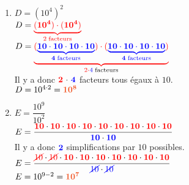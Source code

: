 \documentclass[a4paper,12pt]{report}
\begin{document}
\begin{Correction}
\begin{EXO}{}{}
\begin{enumerate}[itemsep=2em]
\item $D=(10^{4})^{2}$\\$D=\color{red}{\underbrace{\mathbf{\color{red}{(10^4)}} \cdot \mathbf{\color{red}{(10^4)}}}_{2\thickspace\text{facteurs}}}$\\$D=\color{red}{\underbrace{\mathbf{\color{red}{(\color{blue}{\underbrace{\mathbf{\color{blue}{10}} \cdot \mathbf{\color{blue}{10}}\cdot \mathbf{\color{blue}{10}}\cdot \mathbf{\color{blue}{10}}}_{4\thickspace\text{facteurs}}}\color{red})}} \cdot \mathbf{\color{red}{(\color{blue}{\underbrace{\mathbf{\color{blue}{10}} \cdot \mathbf{\color{blue}{10}}\cdot \mathbf{\color{blue}{10}}\cdot \mathbf{\color{blue}{10}}}_{4\thickspace\text{facteurs}}}\color{red})}}}_{2\cdot\color{blue}{4}\thickspace\color{black}{\text{facteurs}}}}$\\Il y a donc $\mathbf{\color{red}{2}~\color{black}{\cdot}~\color{blue}{4}}$ facteurs tous égaux à $10$.\\$D=10^{4\cdot2} = {\color[HTML]{f15929}\boldsymbol{10^{8}}}$
\item $E=\dfrac{10^{9}}{10^{2}}$\\$E=\dfrac{\mathbf{\color{red}{10}} \cdot \mathbf{\color{red}{10}}\cdot \mathbf{\color{red}{10}}\cdot \mathbf{\color{red}{10}}\cdot \mathbf{\color{red}{10}}\cdot \mathbf{\color{red}{10}}\cdot \mathbf{\color{red}{10}}\cdot \mathbf{\color{red}{10}}\cdot \mathbf{\color{red}{10}}}{\mathbf{\color{blue}{10}} \cdot \mathbf{\color{blue}{10}}}$\\Il y a donc $\mathbf{\color{blue}{2}}$ simplifications par $10$ possibles.\\$E=\dfrac{\mathbf{\color{red}{\cancel{10}}} \cdot \mathbf{\color{red}{\cancel{10}}}\cdot\mathbf{\color{red}{10}} \cdot \mathbf{\color{red}{10}}\cdot \mathbf{\color{red}{10}}\cdot \mathbf{\color{red}{10}}\cdot \mathbf{\color{red}{10}}\cdot \mathbf{\color{red}{10}}\cdot \mathbf{\color{red}{10}}}{\mathbf{\color{blue}{\cancel{10}}} \cdot \mathbf{\color{blue}{\cancel{10}}}}$\\$E=10^{9-2}={\color[HTML]{f15929}\boldsymbol{10^{7}}}$
\end{enumerate}

\end{EXO}

\begin{EXO}{}{}


\end{EXO}
\end{Correction}
\end{document}
